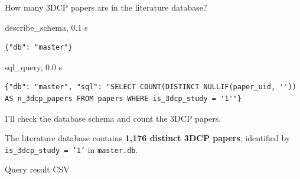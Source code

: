 \begin{userbox}
How many 3DCP papers are in the literature database?
\end{userbox}
\begin{toolbox}{describe\_schema, 0.1 s}
\begin{lstlisting}[style=argstyle]
{"db": "master"}
\end{lstlisting}
\end{toolbox}
\begin{toolbox}{sql\_query, 0.0 s}
\begin{lstlisting}[style=argstyle]
{"db": "master", "sql": "SELECT COUNT(DISTINCT NULLIF(paper_uid, '')) AS n_3dcp_papers FROM papers WHERE is_3dcp_study = '1'"}
\end{lstlisting}
\end{toolbox}
\begin{agentbox}
I'll check the database schema and count the 3DCP papers.\par
The literature database contains \textbf{1,176 distinct 3DCP papers}, identified by \texttt{is\_3dcp\_study = '1'} in \texttt{master.db}.\par
\par
Query result CSV\par
\par
\end{agentbox}